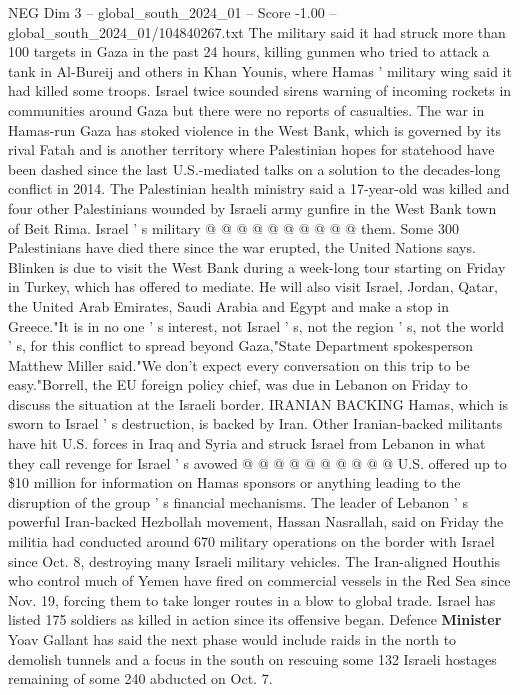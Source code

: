 \begin{textsample}{NEG Dim 3 – global\_south\_2024\_01 – Score -1.00 – global\_south\_2024\_01/104840267.txt}
The military said it had struck more than 100 targets in Gaza in the past 24 hours, killing gunmen who tried to attack a tank in Al-Bureij and others in Khan Younis, where Hamas ' military wing said it had killed some troops.
Israel twice sounded sirens warning of incoming rockets in communities around Gaza but there were no reports of casualties.
The war in Hamas-run Gaza has stoked violence in the West Bank, which is governed by its rival Fatah and is another territory where Palestinian hopes for statehood have been dashed since the last U.S.-mediated talks on a solution to the decades-long conflict in 2014.
The Palestinian health ministry said a 17-year-old was killed and four other Palestinians wounded by Israeli army gunfire in the West Bank town of Beit Rima.
Israel ' s military @ @ @ @ @ @ @ @ @ @ them.
Some 300 Palestinians have died there since the war erupted, the United Nations says.
Blinken is due to visit the West Bank during a week-long tour starting on Friday in Turkey, which has offered to mediate.
He will also visit Israel, Jordan, Qatar, the United Arab Emirates, Saudi Arabia and Egypt and make a stop in Greece."It is in no one ' s interest, not Israel ' s, not the region ' s, not the world ' s, for this conflict to spread beyond Gaza,"State Department spokesperson Matthew Miller said."We don't expect every conversation on this trip to be easy."Borrell, the EU foreign policy chief, was due in Lebanon on Friday to discuss the situation at the Israeli border.
IRANIAN BACKING Hamas, which is sworn to Israel ' s destruction, is backed by Iran.
Other Iranian-backed militants have hit U.S. forces in Iraq and Syria and struck Israel from Lebanon in what they call revenge for Israel ' s avowed @ @ @ @ @ @ @ @ @ @ U.S. offered up to \$10 million for information on Hamas sponsors or anything leading to the disruption of the group ' s financial mechanisms.
The leader of Lebanon ' s powerful Iran-backed Hezbollah movement, Hassan Nasrallah, said on Friday the militia had conducted around 670 military operations on the border with Israel since Oct. 8, destroying many Israeli military vehicles.
The Iran-aligned Houthis who control much of Yemen have fired on commercial vessels in the Red Sea since Nov. 19, forcing them to take longer routes in a blow to global trade.
Israel has listed 175 soldiers as killed in action since its offensive began.
Defence \textbf{Minister} Yoav Gallant has said the next phase would include raids in the north to demolish tunnels and a focus in the south on rescuing some 132 Israeli hostages remaining of some 240 abducted on Oct. 7.

\end{textsample}
